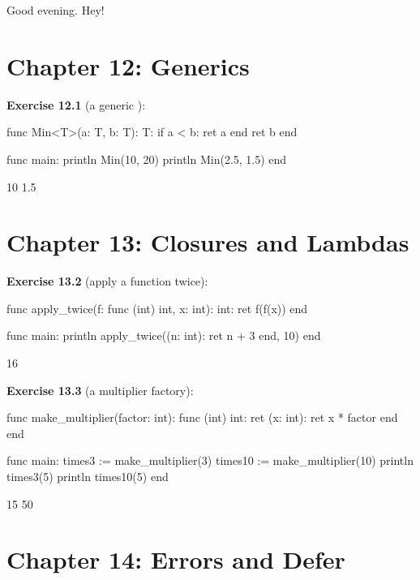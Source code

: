 \begin{progout}
Good evening.
Hey!
\end{progout}

\section*{Chapter 12: Generics}

\textbf{Exercise 12.1} (a generic ):

\begin{salamen}
func Min<T>(a: T, b: T): T:
    if a < b: ret a end
    ret b
end

func main:
    println Min(10, 20)
    println Min(2.5, 1.5)
end
\end{salamen}

\begin{progout}
10
1.5
\end{progout}

\section*{Chapter 13: Closures and Lambdas}

\textbf{Exercise 13.2} (apply a function twice):

\begin{salamen}
func apply_twice(f: func (int) int, x: int): int:
    ret f(f(x))
end

func main:
    println apply_twice((n: int): ret n + 3 end, 10)
end
\end{salamen}

\begin{progout}
16
\end{progout}

\textbf{Exercise 13.3} (a multiplier factory):

\begin{salamen}
func make_multiplier(factor: int): func (int) int:
    ret (x: int): ret x * factor end
end

func main:
    times3 := make_multiplier(3)
    times10 := make_multiplier(10)
    println times3(5)
    println times10(5)
end
\end{salamen}

\begin{progout}
15
50
\end{progout}

\section*{Chapter 14: Errors and Defer}

